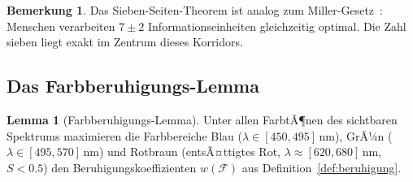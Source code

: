 ﻿\documentclass[a4paper,12pt]{article}
\theoremstyle{definition}
\newtheorem{lemma}{Lemma}
\newtheorem{bemerkung}{Bemerkung}
\begin{document}
\begin{bemerkung}
    Das Sieben-Seiten-Theorem ist analog zum Miller-Gesetz~\cite{miller1956}:
    Menschen verarbeiten $7 \pm 2$ Informationseinheiten gleichzeitig optimal.
    Die Zahl sieben liegt exakt im Zentrum dieses Korridors.
\end{bemerkung}

\subsection{Das Farbberuhigungs-Lemma}

\begin{lemma}[Farbberuhigungs-Lemma]
\label{lem:farbe}
    Unter allen FarbtÃ¶nen des sichtbaren Spektrums maximieren die Farbbereiche
    Blau ($\lambda \in [450, 495]\,\text{nm}$), GrÃ¼n
    ($\lambda \in [495, 570]\,\text{nm}$) und Rotbraun
    (entsÃ¤ttigtes Rot, $\lambda \approx [620, 680]\,\text{nm}$, $S < 0.5$)
    den Beruhigungskoeffizienten $w(\mathcal{F})$ aus Definition~\ref{def:beruhigung}.
\end{lemma}
\end{document}
